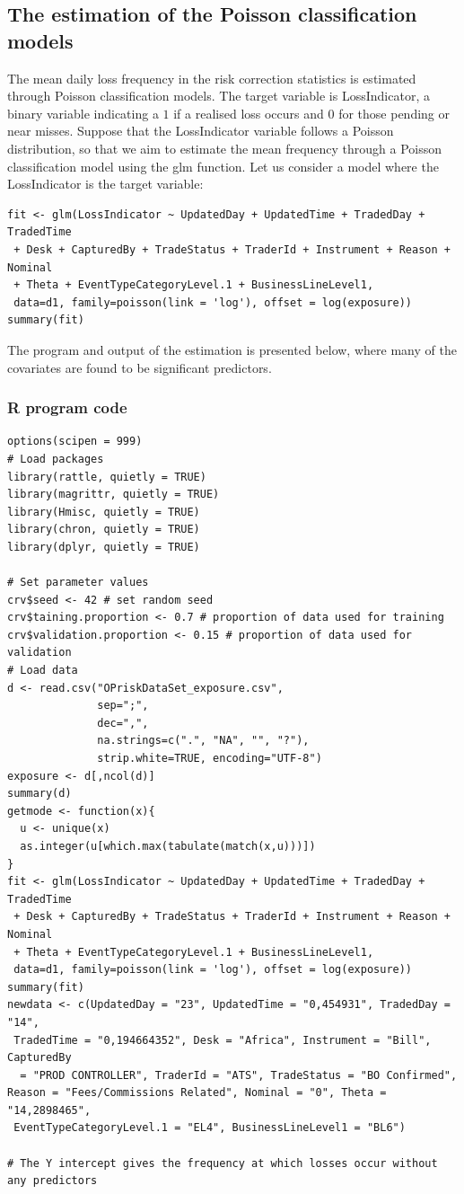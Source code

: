 \documentclass[a4paper]{article}
\begin{document}
\subsection{The estimation of the Poisson classification models}

The mean daily loss frequency in the risk correction statistics is estimated through Poisson classification models. The target variable is LossIndicator, a binary variable indicating a $1$ if a realised loss occurs and $0$ for those pending or near misses. Suppose that the LossIndicator variable follows a Poisson distribution, so that we aim to estimate the mean frequency through a Poisson classification model using the glm function.  Let us consider a model where the LossIndicator is the target variable:
\begin{verbatim}
fit <- glm(LossIndicator ~ UpdatedDay + UpdatedTime + TradedDay + TradedTime
 + Desk + CapturedBy + TradeStatus + TraderId + Instrument + Reason + Nominal
 + Theta + EventTypeCategoryLevel.1 + BusinessLineLevel1,
 data=d1, family=poisson(link = 'log'), offset = log(exposure))
summary(fit)
\end{verbatim}
The program and output of the estimation is presented below, where many of the covariates are found to be significant predictors.

\subsubsection{R program code}

\begin{verbatim}
options(scipen = 999)
# Load packages
library(rattle, quietly = TRUE)
library(magrittr, quietly = TRUE)
library(Hmisc, quietly = TRUE)
library(chron, quietly = TRUE)
library(dplyr, quietly = TRUE)

# Set parameter values
crv$seed <- 42 # set random seed
crv$taining.proportion <- 0.7 # proportion of data used for training
crv$validation.proportion <- 0.15 # proportion of data used for validation
# Load data
d <- read.csv("OPriskDataSet_exposure.csv",
              sep=";",
              dec=",",
              na.strings=c(".", "NA", "", "?"),
              strip.white=TRUE, encoding="UTF-8")
exposure <- d[,ncol(d)] 
summary(d)
getmode <- function(x){
  u <- unique(x)
  as.integer(u[which.max(tabulate(match(x,u)))])
}
fit <- glm(LossIndicator ~ UpdatedDay + UpdatedTime + TradedDay + TradedTime
 + Desk + CapturedBy + TradeStatus + TraderId + Instrument + Reason + Nominal
 + Theta + EventTypeCategoryLevel.1 + BusinessLineLevel1,
 data=d1, family=poisson(link = 'log'), offset = log(exposure))
summary(fit)  
newdata <- c(UpdatedDay = "23", UpdatedTime = "0,454931", TradedDay = "14",
 TradedTime = "0,194664352", Desk = "Africa", Instrument = "Bill", CapturedBy
  = "PROD CONTROLLER", TraderId = "ATS", TradeStatus = "BO Confirmed", 
Reason = "Fees/Commissions Related", Nominal = "0", Theta = "14,2898465",
 EventTypeCategoryLevel.1 = "EL4", BusinessLineLevel1 = "BL6")

# The Y intercept gives the frequency at which losses occur without any predictors
\end{verbatim}
\end{document}
